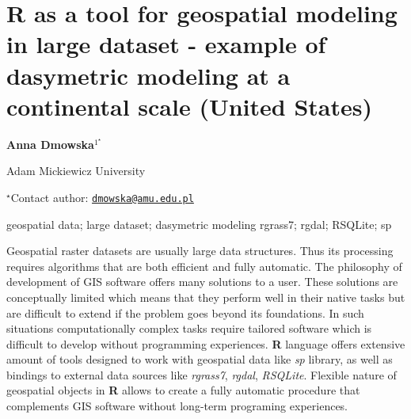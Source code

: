 \documentclass[\main/boa.tex]{subfiles}
\begin{document}
\section{R as a tool for geospatial modeling in large dataset - example of
dasymetric modeling at a continental scale (United States)}

\begin{center}
  {\bf {} Anna Dmowska$^{1^\star}$}
\end{center}

\vskip 0.3cm

\begin{affiliations}
\begin{enumerate}
\begin{minipage}{0.915\textwidth}
\centering
\item Adam Mickiewicz University \\[-2pt]
\end{minipage}
\end{enumerate}
$^\star$Contact author: \href{mailto:dmowska@amu.edu.pl}{\nolinkurl{dmowska@amu.edu.pl}}\\
\end{affiliations}

\vskip 0.5cm

\begin{minipage}{0.915\textwidth}
\keywords geospatial data; large dataset; dasymetric modeling
\packages {} rgrass7;  rgdal;  RSQLite;  sp
\end{minipage}

\vskip 0.8cm

Geospatial raster datasets are usually large data structures. Thus its
processing requires algorithms that are both efficient and fully
automatic. The philosophy of development of GIS software offers many
solutions to a user. These solutions are conceptually limited which
means that they perform well in their native tasks but are difficult to
extend if the problem goes beyond its foundations. In such situations
computationally complex tasks require tailored software which is
difficult to develop without programming experiences. \textbf{R}
language offers extensive amount of tools designed to work with
geospatial data like \emph{sp} library, as well as bindings to external
data sources like \emph{rgrass7}, \emph{rgdal}, \emph{RSQLite}. Flexible
nature of geospatial objects in \textbf{R} allows to create a fully
automatic procedure that complements GIS software without long-term
programing experiences.
\end{document}

